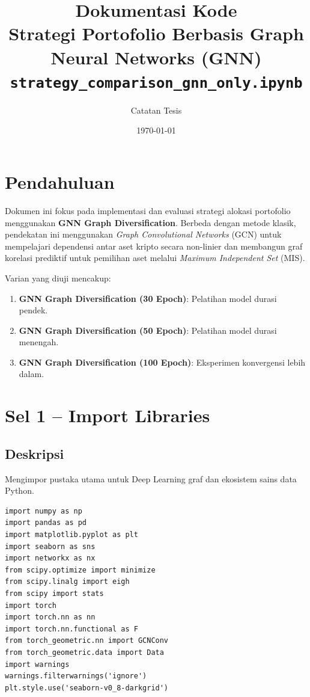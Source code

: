 \documentclass[12pt,a4paper]{article}
\title{\textbf{Dokumentasi Kode} \\ \large Strategi Portofolio Berbasis Graph Neural Networks (GNN) \\
\small \texttt{strategy\_comparison\_gnn\_only.ipynb}}
\author{Catatan Tesis}
\date{\today}
\begin{document}
\maketitle
\tableofcontents
\newpage

\section{Pendahuluan}
Dokumen ini fokus pada implementasi dan evaluasi strategi alokasi portofolio menggunakan 
\textbf{GNN Graph Diversification}. Berbeda dengan metode klasik, pendekatan ini 
menggunakan \textit{Graph Convolutional Networks} (GCN) untuk mempelajari dependensi 
antar aset kripto secara non-linier dan membangun graf korelasi prediktif untuk 
pemilihan aset melalui \textit{Maximum Independent Set} (MIS).

Varian yang diuji mencakup:
\begin{enumerate}
    \item \textbf{GNN Graph Diversification (30 Epoch)}: Pelatihan model durasi pendek.
    \item \textbf{GNN Graph Diversification (50 Epoch)}: Pelatihan model durasi menengah.
    \item \textbf{GNN Graph Diversification (100 Epoch)}: Eksperimen konvergensi lebih dalam.
\end{enumerate}

\section{Sel 1 -- Import Libraries}

\subsection{Deskripsi}
Mengimpor pustaka utama untuk Deep Learning graf dan ekosistem sains data Python.
\begin{lstlisting}[caption={Import libraries}]
import numpy as np
import pandas as pd
import matplotlib.pyplot as plt
import seaborn as sns
import networkx as nx
from scipy.optimize import minimize
from scipy.linalg import eigh
from scipy import stats
import torch
import torch.nn as nn
import torch.nn.functional as F
from torch_geometric.nn import GCNConv
from torch_geometric.data import Data
import warnings
warnings.filterwarnings('ignore')
plt.style.use('seaborn-v0_8-darkgrid')
\end{lstlisting}
\end{document}
